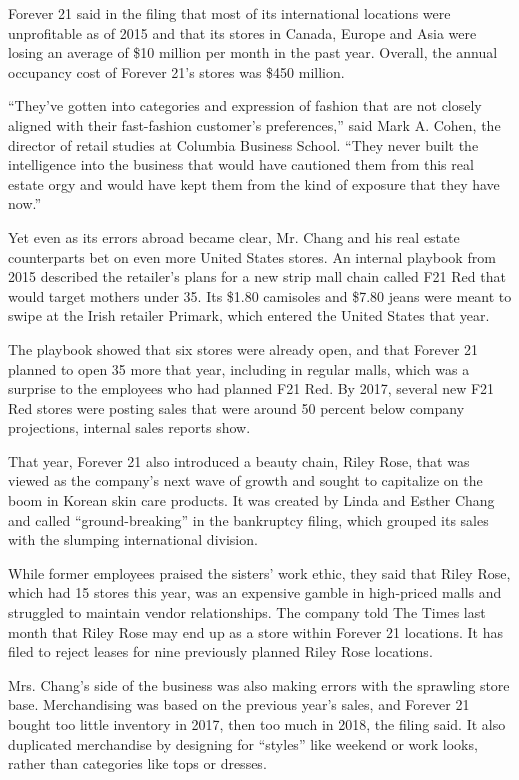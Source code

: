 Forever 21 said in the filing that most of its international locations
were unprofitable as of 2015 and that its stores in Canada, Europe and
Asia were losing an average of \$10 million per month in the past year.
Overall, the annual occupancy cost of Forever 21's stores was \$450
million.

``They've gotten into categories and expression of fashion that are not
closely aligned with their fast-fashion customer's preferences,'' said
Mark A. Cohen, the director of retail studies at Columbia Business
School. ``They never built the intelligence into the business that would
have cautioned them from this real estate orgy and would have kept them
from the kind of exposure that they have now.''

Yet even as its errors abroad became clear, Mr. Chang and his real
estate counterparts bet on even more United States stores. An internal
playbook from 2015 described the retailer's plans for a new strip mall
chain called F21 Red that would target mothers under 35. Its \$1.80
camisoles and \$7.80 jeans were meant to swipe at the Irish retailer
Primark, which entered the United States that year.

The playbook showed that six stores were already open, and that Forever
21 planned to open 35 more that year, including in regular malls, which
was a surprise to the employees who had planned F21 Red. By 2017,
several new F21 Red stores were posting sales that were around 50
percent below company projections, internal sales reports show.

That year, Forever 21 also introduced a beauty chain, Riley Rose, that
was viewed as the company's next wave of growth and sought to capitalize
on the boom in Korean skin care products. It was created by Linda and
Esther Chang and called ``ground-breaking'' in the bankruptcy filing,
which grouped its sales with the slumping international division.

While former employees praised the sisters' work ethic, they said that
Riley Rose, which had 15 stores this year, was an expensive gamble in
high-priced malls and struggled to maintain vendor relationships. The
company told The Times last month that Riley Rose may end up as a store
within Forever 21 locations. It has filed to reject leases for nine
previously planned Riley Rose locations.

Mrs. Chang's side of the business was also making errors with the
sprawling store base. Merchandising was based on the previous year's
sales, and Forever 21 bought too little inventory in 2017, then too much
in 2018, the filing said. It also duplicated merchandise by designing
for ``styles'' like weekend or work looks, rather than categories like
tops or dresses.

